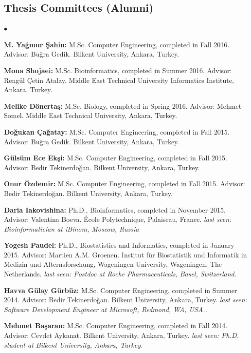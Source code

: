 \documentclass[margin,line]{res}
\newenvironment{list2}{
  \begin{list}{$\bullet$}{%
      \setlength{\itemsep}{0in}
      \setlength{\parsep}{0in} \setlength{\parskip}{0in}
      \setlength{\topsep}{0in} \setlength{\partopsep}{0in} 
      \setlength{\leftmargin}{0.2in}}}{\end{list}}
\begin{document}
\begin{resume}
\subsection{\small \sc Thesis Committees (Alumni)}
\begin{list2}
\item
  {\bf M. Yağmur Şahin:} M.Sc. Computer Engineering, completed in Fall 2016. Advisor: Buğra Gedik.
  Bilkent University, Ankara, Turkey. 
\item
  {\bf Mona Shojaei:} M.Sc. Bioinformatics, completed in Summer 2016. Advisor: Rengül Çetin Atalay.
  Middle East Technical University Informatics Institute, Ankara, Turkey.
\item
  {\bf Melike Dönertaş:} M.Sc. Biology, completed in Spring 2016. Advisor: Mehmet Somel.
  Middle East Technical University, Ankara, Turkey. 
\item
  {\bf Doğukan Çağatay:} M.Sc. Computer Engineering, completed in Fall 2015. Advisor: Buğra Gedik.
  Bilkent University, Ankara, Turkey. 
\item
  {\bf Gülsüm Ece Ekşi:} M.Sc. Computer Engineering, completed in Fall 2015. Advisor: Bedir Tekinerdoğan.
  Bilkent University, Ankara, Turkey. 
\item
  {\bf Onur Özdemir:} M.Sc. Computer Engineering, completed in Fall 2015. Advisor: Bedir Tekinerdoğan.
  Bilkent University, Ankara, Turkey. 
\item
  {\bf Daria Iakovishina:} Ph.D., Bioinformatics, completed in November 2015.
  Advisor:  Valentina Boeva.
  École Polytechnique, Palaiseau, France.
  {\it last seen: Bioinformatician at iBinom, Moscow, Russia}
\item
  {\bf Yogesh Paudel:} Ph.D., Biostatistics and Informatics, completed in January 2015.
  Advisor: Martien A.M. Groenen.
  Institut für Biostatistik und Informatik in Medizin und Alternsforschung,  Wageningen University, Wageningen, The Netherlands.
  {\it last seen: Postdoc at Roche Pharmaceuticals, Basel, Switzerland.}
\item
  {\bf Havva Gülay Gürbüz:} M.Sc. Computer Engineering, completed in Summer 2014. Advisor: Bedir Tekinerdoğan.
  Bilkent University, Ankara, Turkey. 
  {\it last seen: Software Development Engineer at Microsoft, Redmond, WA, USA..}
\item
  {\bf Mehmet Başaran:} M.Sc. Computer Engineering, completed in Fall 2014. Advisor: Cevdet Aykanat.
  Bilkent University, Ankara, Turkey. {\it last seen: Ph.D. student at Bilkent University, Ankara, Turkey.}


\end{list2}
\end{resume}
\end{document}
